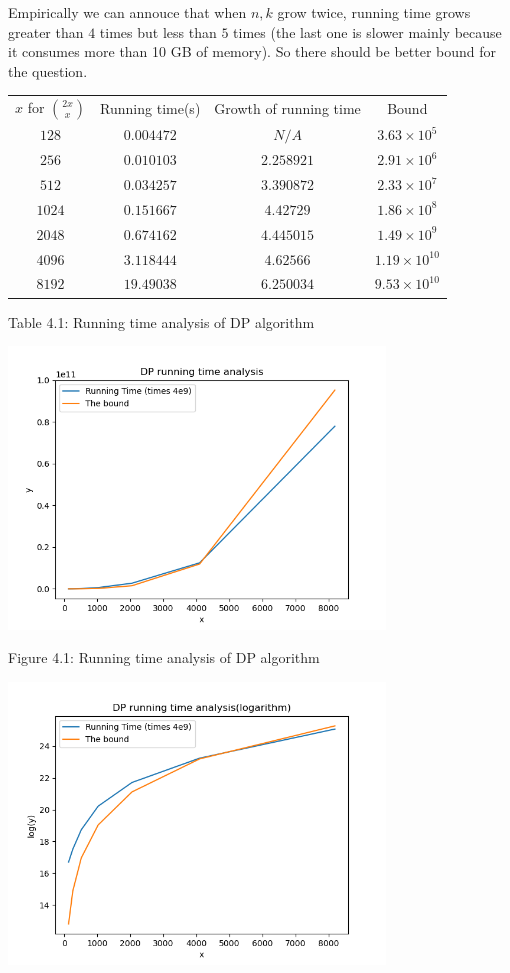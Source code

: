 \documentclass[11pt,a4paper,oneside]{article}
\begin{document}
\begin{problem}{4}
	Empirically we can annouce that when $n, k$ grow twice, running time grows greater than $4$ times but less than $5$ times (the last one is slower mainly because it consumes more than 10 GB of memory). So there should be better bound for the question.
\begin{table}[htbp]
	\centering
	  \begin{tabular}{cccc}
	  $x$ for ${2x \choose x}$ &    Running time(s) & Growth of running time   & Bound \\
	  $128$&$0.004472$&$N/A$&$3.63 \times 10^{ 5 }$\\
$256$&$0.010103$&$2.258921$&$2.91 \times 10^{ 6 }$\\
$512$&$0.034257$&$3.390872$&$2.33 \times 10^{ 7 }$\\
$1024$&$0.151667$&$4.42729$&$1.86 \times 10^{ 8 }$\\
$2048$&$0.674162$&$4.445015$&$1.49 \times 10^{ 9 }$\\
$4096$&$3.118444$&$4.62566$&$1.19 \times 10^{ 10 }$\\
$8192$&$19.49038$&$6.250034$&$9.53 \times 10^{ 10 }$\\
	  \end{tabular}%
	\par\scriptsize Table 4.1: Running time analysis of DP algorithm
  \end{table}%
  \begin{center}
	\includegraphics[width=100mm]{Figure_3.png}\scriptsize\par
	Figure 4.1: Running time analysis of DP algorithm
	\end{center}
	\begin{center}
	\includegraphics[width=100mm]{Figure_4.png}\scriptsize\par

\end{center}
\end{problem}
\end{document}
